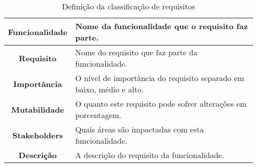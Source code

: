       \begin{table}[h!]
        \centering
        \begin{tabular}{|c|p{10cm}|}
          \hline
          \textbf{Funcionalidade} &
          Nome da funcionalidade que o requisito faz parte. \\ \hline
          \textbf{Requisito} &
          Nome do requisito que faz parte da funcionalidade. \\ \hline
          \textbf{Importância} &
          O nível de importância do requisito separado em baixo, médio e alto. \\ \hline
          \textbf{Mutabilidade} &
          O quanto este requisito pode sofrer alterações em porcentagem. \\ \hline
          \textbf{Stakeholders} &
          Quais áreas são impactadas com esta funcionalidade. \\ \hline
          \textbf{Descrição} &
          A descrição do requisito da funcionalidade. \\ \hline
        \end{tabular}
        \caption{Definição da classificação de requisitos}
        \label{Tabela:4}
      \end{table}

